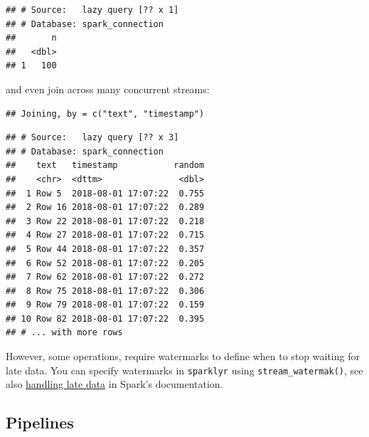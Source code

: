 \documentclass[]{book}
\newenvironment{Shaded}{\begin{snugshade}}{\end{snugshade}}
\newcommand{\DataTypeTok}[1]{\textcolor[rgb]{0.13,0.29,0.53}{#1}}
\newcommand{\KeywordTok}[1]{\textcolor[rgb]{0.13,0.29,0.53}{\textbf{#1}}}
\newcommand{\NormalTok}[1]{#1}
\newcommand{\OperatorTok}[1]{\textcolor[rgb]{0.81,0.36,0.00}{\textbf{#1}}}
\newcommand{\StringTok}[1]{\textcolor[rgb]{0.31,0.60,0.02}{#1}}
\theoremstyle{definition}
\theoremstyle{definition}
\theoremstyle{definition}
\theoremstyle{remark}
\begin{document}
\begin{verbatim}
## # Source:   lazy query [?? x 1]
## # Database: spark_connection
##       n
##   <dbl>
## 1   100
\end{verbatim}

and even join across many concurrent streams:

\begin{Shaded}
\end{Shaded}

\begin{verbatim}
## Joining, by = c("text", "timestamp")
\end{verbatim}

\begin{verbatim}
## # Source:   lazy query [?? x 3]
## # Database: spark_connection
##    text   timestamp           random
##    <chr>  <dttm>               <dbl>
##  1 Row 5  2018-08-01 17:07:22  0.755
##  2 Row 16 2018-08-01 17:07:22  0.289
##  3 Row 22 2018-08-01 17:07:22  0.218
##  4 Row 27 2018-08-01 17:07:22  0.715
##  5 Row 44 2018-08-01 17:07:22  0.357
##  6 Row 52 2018-08-01 17:07:22  0.205
##  7 Row 62 2018-08-01 17:07:22  0.272
##  8 Row 75 2018-08-01 17:07:22  0.306
##  9 Row 79 2018-08-01 17:07:22  0.159
## 10 Row 82 2018-08-01 17:07:22  0.395
## # ... with more rows
\end{verbatim}

However, some operations, require watermarks to define when to stop
waiting for late data. You can specify watermarks in \texttt{sparklyr}
using \texttt{stream\_watermak()}, see also
\href{https://spark.apache.org/docs/latest/structured-streaming-programming-guide.html\#handling-late-data-and-watermarking}{handling
late data} in Spark's documentation.

\hypertarget{streams-pipelines}{%
\subsection{Pipelines}\label{streams-pipelines}}
\end{document}
